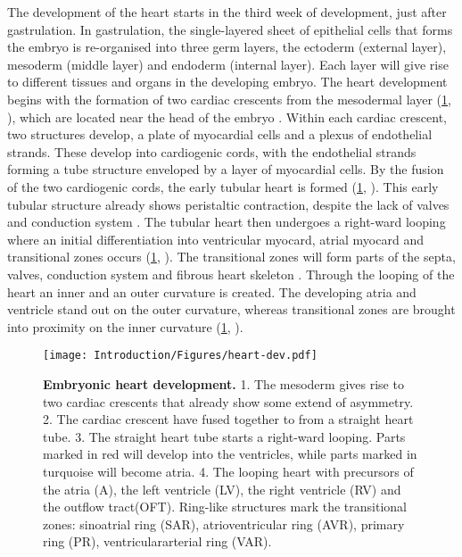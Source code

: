 The development of the heart starts in the third week of development, just after gastrulation. In gastrulation, the single-layered sheet of epithelial cells that forms the embryo is re-organised into three germ layers, the ectoderm (external layer), mesoderm  (middle layer) and endoderm (internal layer). Each layer will give rise to different tissues and organs in the developing embryo. The heart development begins with the formation of two cardiac crescents from the mesodermal layer (\cref{fig:dev-heart}, ), which are located near the head of the embryo \citep{Christoffels2000}. Within each cardiac crescent, two structures develop, a plate of myocardial cells and a plexus of endothelial strands. These develop into cardiogenic cords, with the endothelial strands forming a tube structure enveloped  by a layer of myocardial cells. By the fusion of the two cardiogenic cords, the early tubular heart is formed (\cref{fig:dev-heart}, ). This early tubular structure already shows peristaltic contraction, despite the lack of valves and conduction system \citep{Goss1938,deJong1992,Moorman1994}. The tubular heart then undergoes a right-ward looping where an initial differentiation into ventricular myocard, atrial myocard and transitional zones occurs (\cref{fig:dev-heart}, ). The transitional zones will form parts of the septa, valves, conduction system and fibrous heart skeleton \citep{Gittenberger-deGroot2005}. Through the looping of the heart an inner and an outer curvature is created. The developing atria and ventricle stand out on the outer curvature, whereas transitional zones are brought into proximity on the inner curvature (\cref{fig:dev-heart}, ). 

\begin{figure}[hbtp]
	\centering
	\texttt{[image: Introduction/Figures/heart-dev.pdf]}
	\caption[\textbf{Embryonic heart development. }]{\textbf{Embryonic heart development. } 1. The mesoderm gives rise to two cardiac crescents that already show some extend of asymmetry. 2. The cardiac crescent have fused together to from a straight heart tube. 3. The straight heart tube starts a right-ward looping. Parts marked in red will develop into the ventricles, while parts marked in turquoise will become atria. 4. The looping heart with precursors of the atria (A), the left ventricle (LV), the right ventricle (RV) and the outflow tract(OFT). Ring-like structures mark the transitional zones: sinoatrial ring (SAR), atrioventricular ring (AVR), primary ring (PR), ventriculararterial ring (VAR).} 
	 	\label{fig:dev-heart}
\end{figure}

